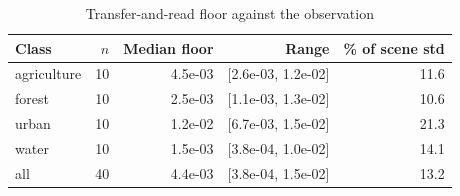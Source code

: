 \begin{table}[t]
\centering
\caption{Transfer-and-read floor against the observation}
\label{tab:representation_floor}
\footnotesize
\setlength{\tabcolsep}{3pt}
\begin{tabular}{lrrrr}
\toprule
Class & $n$ & Median floor & Range & \% of scene std \\
\midrule
agriculture & 10 & 4.5e-03 & [2.6e-03, 1.2e-02] & 11.6 \\
forest & 10 & 2.5e-03 & [1.1e-03, 1.3e-02] & 10.6 \\
urban & 10 & 1.2e-02 & [6.7e-03, 1.5e-02] & 21.3 \\
water & 10 & 1.5e-03 & [3.8e-04, 1.0e-02] & 14.1 \\
\midrule
all & 40 & 4.4e-03 & [3.8e-04, 1.5e-02] & 13.2 \\
\bottomrule
\end{tabular}
\end{table}
